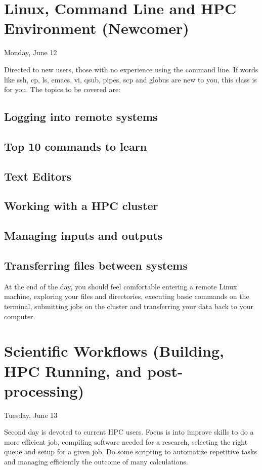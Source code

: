 \documentclass[letterpaper,twoside]{srcbook}
\begin{document}
\chapter{Linux, Command Line and HPC Environment (Newcomer)}

Monday, June 12

Directed to new users, those with no experience using the command line. If words like ssh, cp, ls, emacs, vi, qsub, pipes, scp and globus are new to you, this class is for you. The topics to be covered are:

\section{Logging into remote systems}
\section{Top 10 commands to learn}
\section{Text Editors}
\section{Working with a HPC cluster}
\section{Managing inputs and outputs}
\section{Transferring files between systems}

At the end of the day, you should feel comfortable entering a remote Linux machine, exploring your files and directories, executing basic commands on the terminal, submitting jobs on the cluster and transferring your data back to your computer.

\chapter{Scientific Workflows (Building, HPC Running, and post-processing)}

Tuesday, June 13

Second day is devoted to current HPC users. Focus is into improve skills to do a more efficient job, compiling software needed for a research, selecting the right queue and setup for a given job. Do some scripting to automatize repetitive tasks and managing efficiently the outcome of many calculations.
\end{document}

